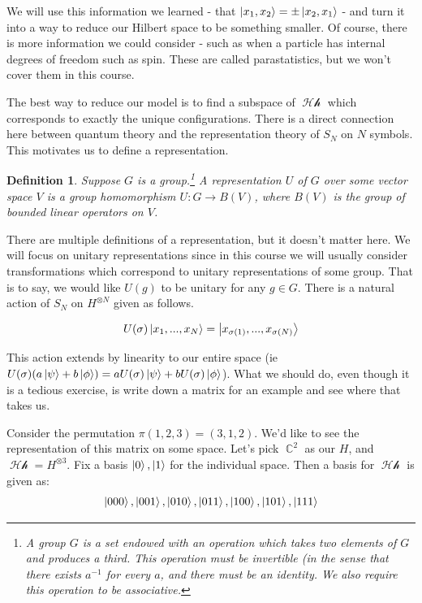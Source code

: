 \documentclass{article}
\DeclareMathOperator{\Hh}{\mathcal{Hh}}
\DeclareMathOperator{\CC}{\mathbb{C}}
\newtheorem{defn}{Definition}
\begin{document}
We will use this information we learned - that $\ket{x_1,x_2} = \pm \ket{x_2, x_1}$ - and turn it into a way to reduce our Hilbert space to be something smaller. Of course, there is more information we could consider - such as when a particle has internal degrees of freedom such as spin. These are called parastatistics, but we won't cover them in this course.

The best way to reduce our model is to find a subspace of $\Hh$ which corresponds to exactly the unique configurations. There is a direct connection here between quantum theory and the representation theory of $S_N$ on $N$ symbols. This motivates us to define a representation.

\begin{defn}
Suppose $G$ is a group.\footnote{A group $G$ is a set endowed with an operation which takes two elements of $G$ and produces a third. This operation must be invertible (in the sense that there exists $a^{-1}$ for every $a$, and there must be an identity. We also require this operation to be associative.} A representation $U$ of $G$ over some vector space $V$ is a group homomorphism $U:G \to B(V)$, where $B(V)$ is the group of bounded linear operators on $V$.
\end{defn}

There are multiple definitions of a representation, but it doesn't matter here. We will focus on unitary representations since in this course we will usually consider transformations which correspond to unitary representations of some group. That is to say, we would like $U(g)$ to be unitary for any $g \in G$. There is a natural action of $S_N$ on $H^{\otimes N}$ given as follows.

\begin{equation}
U(\sigma)\ket{x_1,...,x_N} = \ket{x_{\sigma(1)},...,x_{\sigma(N)}}
\end{equation}

This action extends by linearity to our entire space (ie $U(\sigma)(a\ket{\psi}+b\ket{\phi}) = aU(\sigma)\ket{\psi}+bU(\sigma)\ket{\phi}$). What we should do, even though it is a tedious exercise, is write down a matrix for an example and see where that takes us.

Consider the permutation $\pi(1,2,3)=(3,1,2)$. We'd like to see the representation of this matrix on some space. Let's pick $\CC^2$ as our $H$, and $\Hh=H^{\otimes 3}$. Fix a basis $\ket{0},\ket{1}$ for the individual space. Then a basis for $\Hh$ is given as:
\[\ket{000},\ket{001},\ket{010},\ket{011},\ket{100},\ket{101},\ket{111}\]
\end{document}
